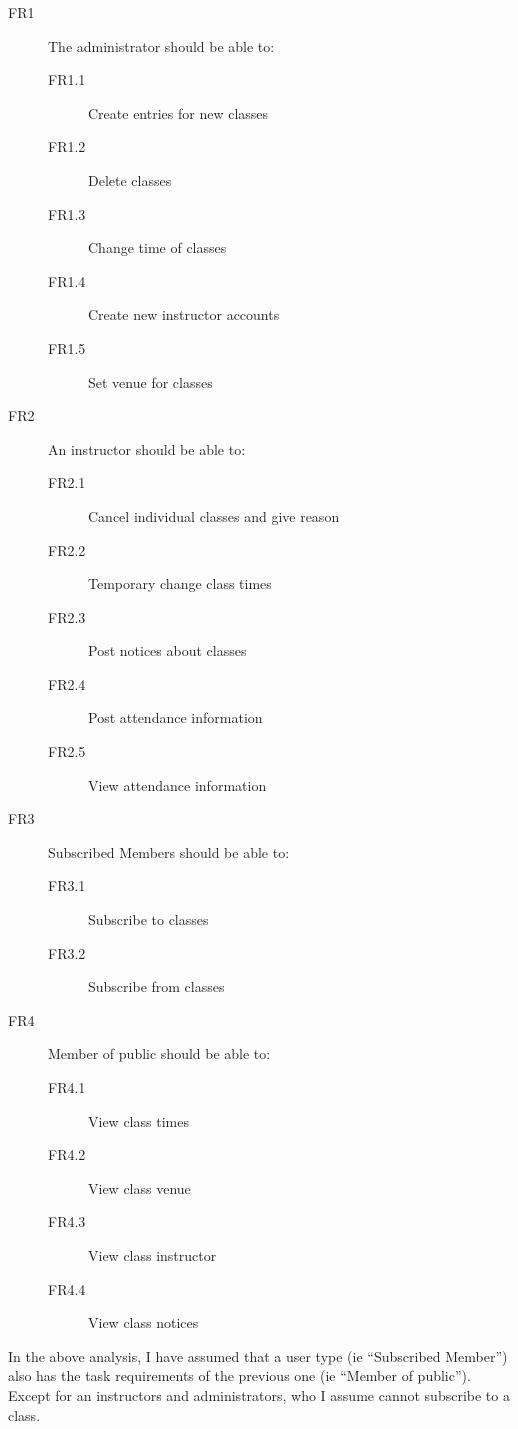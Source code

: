 \documentclass[10pt]{article}
\begin{document}
    \begin{description}
      \item[FR1] The administrator should be able to:
      \begin{description}
        \item[FR1.1] Create entries for new classes
        \item[FR1.2] Delete classes
        \item[FR1.3] Change time of classes
        \item[FR1.4] Create new instructor accounts
        \item[FR1.5] Set venue for classes
      \end{description}
      \item[FR2] An instructor should be able to:
      \begin{description}
        \item[FR2.1] Cancel individual classes and give reason
        \item[FR2.2] Temporary change class times
        \item[FR2.3] Post notices about classes
        \item[FR2.4] Post attendance information
        \item[FR2.5] View attendance information
      \end{description}
      \item[FR3] Subscribed Members should be able to:
      \begin{description}
        \item[FR3.1] Subscribe to classes
        \item[FR3.2] Subscribe from classes
      \end{description}
      \item[FR4] Member of public should be able to:
      \begin{description}
        \item[FR4.1] View class times
        \item[FR4.2] View class venue
        \item[FR4.3] View class instructor
        \item[FR4.4] View class notices
      \end{description}
    \end{description}

    In the above analysis, I have assumed that a user type (ie ``Subscribed Member'') also has the task requirements of the previous one (ie ``Member of public''). Except for an instructors and administrators, who I assume cannot subscribe to a class.
\end{document}
